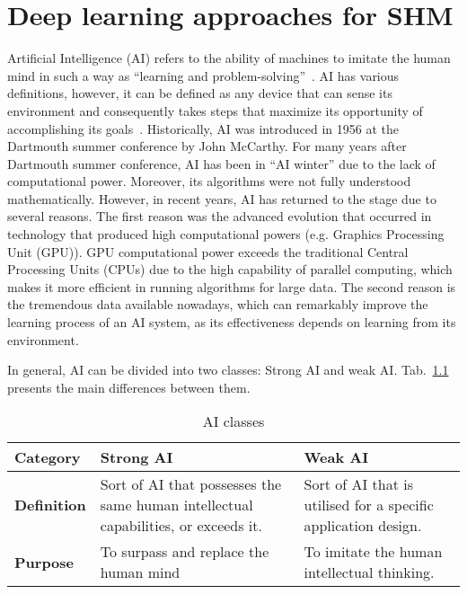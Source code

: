 \chapter[Data-driven for SHM]{Deep learning approaches for SHM}
\label{ch3}
Artificial Intelligence (AI) refers to the ability of machines to imitate the human mind in such a way as  \enquote{learning and problem-solving}~\cite{Russell2010}.
AI has various definitions, however, it can be defined as any device that can sense its environment and consequently takes steps that maximize its opportunity of accomplishing its goals~\cite{Russell2010}.
Historically, AI was introduced in 1956 at the Dartmouth summer conference by John McCarthy.
For many years after Dartmouth summer conference, AI has been in \enquote{AI winter} due to the lack of computational power.
Moreover, its algorithms were not fully understood mathematically.
However, in recent years, AI has returned to the stage due to several reasons. 
The first reason was the advanced evolution that occurred in technology that produced high computational powers (e.g. Graphics Processing Unit (GPU)). 
GPU computational power exceeds the traditional Central Processing Units (CPUs) due to the high capability of parallel computing, which makes it more efficient in running algorithms for large data.
The second reason is the tremendous data available nowadays, which can remarkably improve the learning process of an AI system, as its effectiveness depends on learning from its environment. 

In general, AI can be divided into two classes: Strong AI and weak AI. Tab.~\ref{tab:Strong_Weak_AI} presents the main differences between them.
\begin{table}[h]
	\renewcommand{\arraystretch}{1.1}
	\centering
	\caption{AI classes}
	\scriptsize
	\begin{tabular}{p{2cm}p{4cm}p{4cm}} 
		\toprule
		\textbf{Category} & \textbf{Strong AI} & \textbf{Weak AI} \\ \midrule
		\textbf{Definition} & Sort of AI that possesses the same human intellectual capabilities, or exceeds it. & Sort of AI that is utilised for a specific application design. \\ \midrule
		
		\textbf{Purpose} &To surpass and replace the human mind  &  To imitate the human intellectual thinking. \\  
		\bottomrule
	\end{tabular}
	\label{tab:Strong_Weak_AI}
\end{table}
